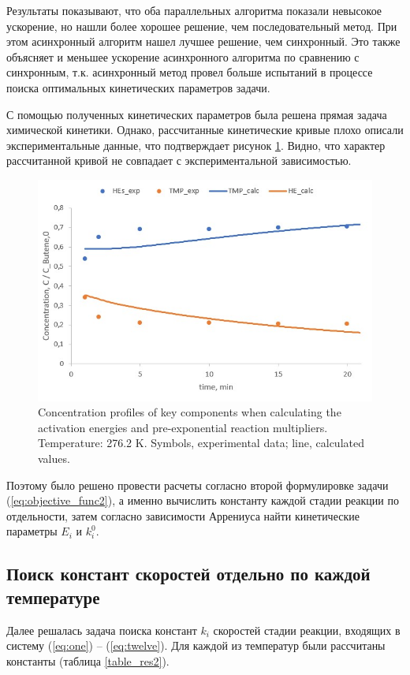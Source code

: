 \documentclass{svproc}
\begin{document}
Результаты показывают, что оба параллельных алгоритма показали невысокое ускорение, но нашли более хорошее решение, чем последовательный метод. При этом асинхронный алгоритм нашел лучшее решение, чем синхронный. Это также объясняет и меньшее  ускорение асинхронного алгоритма по сравнению с синхронным, т.к. асинхронный метод провел больше испытаний в процессе поиска оптимальных кинетических параметров задачи.

С помощью полученных кинетических параметров была решена прямая задача химической кинетики. Однако, рассчитанные кинетические кривые плохо описали экспериментальные данные, что подтверждает рисунок \ref{fig:res1}. Видно, что характер рассчитанной кривой не совпадает с экспериментальной зависимостью.

\begin{figure}
\begin{center}
  \includegraphics[width=0.7\linewidth]{res1.jpg}
  \caption{Concentration profiles of key components when calculating the activation energies and pre-exponential reaction multipliers. Temperature: 276.2 K. Symbols, experimental data; line, calculated values.}
  \label{fig:res1}  
\end{center}
\end{figure}

Поэтому было решено провести расчеты согласно второй формулировке задачи (\ref{eq:objective_func2}), а именно вычислить константу каждой стадии реакции по отдельности, затем согласно зависимости Аррениуса найти кинетические параметры $E_i$ и $k_i^0$.

\subsection{Поиск констант скоростей отдельно по каждой температуре}

Далее решалась задача поиска констант $k_i$ скоростей стадии реакции, входящих в систему  (\ref{eq:one}) -- (\ref{eq:twelve}). Для каждой из температур были рассчитаны константы (таблица \ref{table_res2}).
\end{document}
